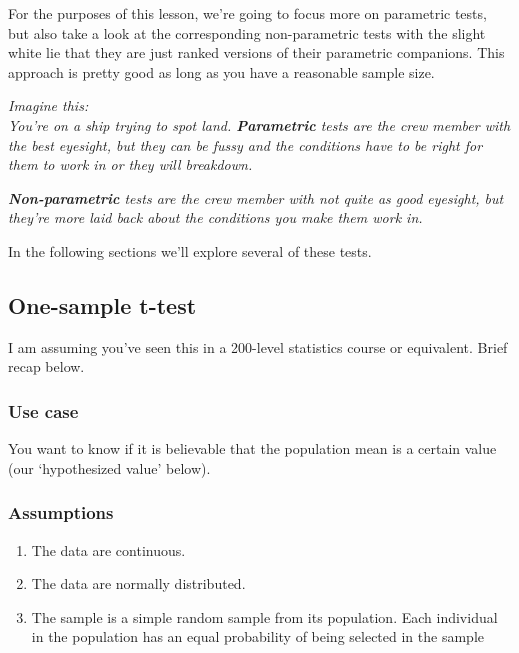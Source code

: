 \documentclass[
  openany]{book}
\providecommand{\tightlist}{%
  \setlength{\itemsep}{0pt}\setlength{\parskip}{0pt}}
\begin{document}
For the purposes of this lesson, we're going to focus more on parametric tests, but also take a look at the corresponding non-parametric tests with the slight white lie that they are just ranked versions of their parametric companions. This approach is pretty good as long as you have a reasonable sample size.

\emph{Imagine this:}\\
\emph{You're on a ship trying to spot land. \textbf{Parametric} tests are the crew member with the best eyesight, but they can be fussy and the conditions have to be right for them to work in or they will breakdown.}

\emph{\textbf{Non-parametric} tests are the crew member with not quite as good eyesight, but they're more laid back about the conditions you make them work in.}

In the following sections we'll explore several of these tests.

\hypertarget{one-sample-t-test}{%
\subsection{One-sample t-test}\label{one-sample-t-test}}

I am assuming you've seen this in a 200-level statistics course or equivalent. Brief recap below.

\hypertarget{use-case}{%
\subsubsection{Use case}\label{use-case}}

You want to know if it is believable that the population mean is a certain value (our `hypothesized value' below).

\hypertarget{assumptions}{%
\subsubsection{Assumptions}\label{assumptions}}

\begin{enumerate}
\def\labelenumi{\arabic{enumi}.}
\tightlist
\item
  The data are continuous.
\item
  The data are normally distributed.
\item
  The sample is a simple random sample from its population. Each individual in the population has an equal probability of being selected in the sample
\end{enumerate}
\end{document}
